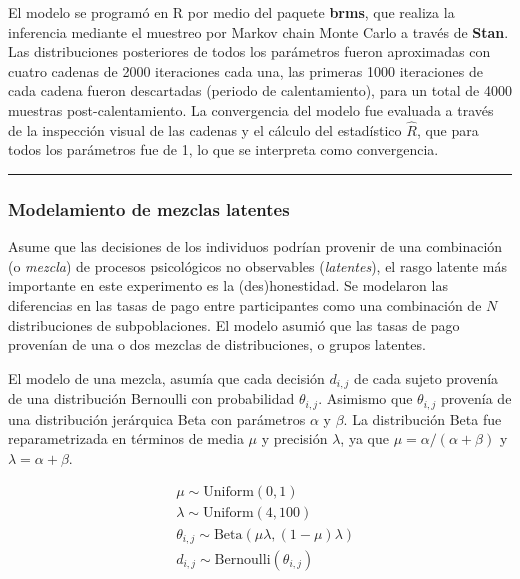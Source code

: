 \documentclass[12pt,]{article}
\begin{document}
El modelo se programó en R por medio del paquete \textbf{brms}, que
realiza la inferencia mediante el muestreo por Markov chain Monte Carlo
a través de \textbf{Stan}. Las distribuciones posteriores de todos los
parámetros fueron aproximadas con cuatro cadenas de 2000 iteraciones
cada una, las primeras 1000 iteraciones de cada cadena fueron
descartadas (periodo de calentamiento), para un total de 4000 muestras
post-calentamiento. La convergencia del modelo fue evaluada a través de
la inspección visual de las cadenas y el cálculo del estadístico
\(\hat{R}\), que para todos los parámetros fue de 1, lo que se
interpreta como convergencia.

\begin{center}\rule{0.5\linewidth}{\linethickness}\end{center}

\subsubsection{Modelamiento de mezclas
latentes}\label{modelamiento-de-mezclas-latentes}

Asume que las decisiones de los individuos podrían provenir de una
combinación (o \emph{mezcla}) de procesos psicológicos no observables
(\emph{latentes}), el rasgo latente más importante en este experimento
es la (des)honestidad. Se modelaron las diferencias en las tasas de pago
entre participantes como una combinación de \(N\) distribuciones de
subpoblaciones. El modelo asumió que las tasas de pago provenían de una
o dos mezclas de distribuciones, o grupos latentes.

El modelo de una mezcla, asumía que cada decisión \(d_{i,j}\) de cada
sujeto provenía de una distribución Bernoulli con probabilidad
\(\theta_{i,j}\). Asimismo que \(\theta_{i,j}\) provenía de una
distribución jerárquica Beta con parámetros \(\alpha\) y \(\beta\). La
distribución Beta fue reparametrizada en términos de media \(\mu\) y
precisión \(\lambda\), ya que \(\mu = \alpha/(\alpha + \beta)\) y
\(\lambda = \alpha + \beta\).

\[
\begin{aligned}
&\mu \sim \mathrm{Uniform}(0, 1)\\
&\lambda \sim \mathrm{Uniform}(4, 100)\\
&\theta_{i,j} \sim \mathrm{Beta}(\mu\lambda, (1 - \mu)\lambda)\\
&d_{i,j} \sim \mathrm{Bernoulli}(\theta_{i,j}) 
\end{aligned}
\]
\end{document}
